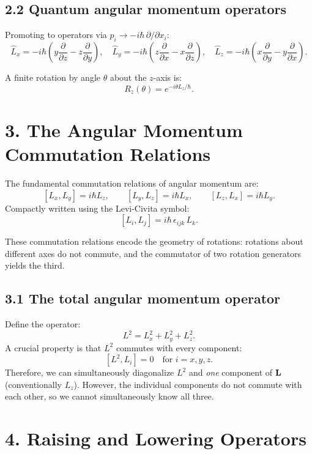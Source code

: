 \documentclass[12pt,a4paper]{article}
\begin{document}
\subsection{2.2 Quantum angular momentum operators}

Promoting to operators via $p_i \to -i\hbar\,\partial/\partial x_i$:
\[
    \hat{L}_x = -i\hbar\left(y\frac{\partial}{\partial z} - z\frac{\partial}{\partial y}\right), \quad
    \hat{L}_y = -i\hbar\left(z\frac{\partial}{\partial x} - x\frac{\partial}{\partial z}\right), \quad
    \hat{L}_z = -i\hbar\left(x\frac{\partial}{\partial y} - y\frac{\partial}{\partial x}\right).
\]

A finite rotation by angle $\theta$ about the $z$-axis is:
\[
    R_z(\theta) = e^{-i\theta L_z/\hbar}.
\]

\section{3. The Angular Momentum Commutation Relations}

The fundamental commutation relations of angular momentum are:
\[
    \boxed{[L_x, L_y] = i\hbar L_z, \qquad [L_y, L_z] = i\hbar L_x, \qquad [L_z, L_x] = i\hbar L_y.}
\]
Compactly written using the Levi-Civita symbol:
\[
    [L_i, L_j] = i\hbar\,\epsilon_{ijk}\,L_k.
\]

These commutation relations encode the geometry of rotations: rotations about different axes do not commute, and the commutator of two rotation generators yields the third.

\subsection{3.1 The total angular momentum operator}

Define the operator:
\[
    L^2 = L_x^2 + L_y^2 + L_z^2.
\]
A crucial property is that $L^2$ commutes with every component:
\[
    [L^2, L_i] = 0 \quad \text{for } i = x, y, z.
\]
Therefore, we can simultaneously diagonalize $L^2$ and \emph{one} component of $\vb{L}$ (conventionally $L_z$).  However, the individual components do not commute with each other, so we cannot simultaneously know all three.

\section{4. Raising and Lowering Operators}
\end{document}
